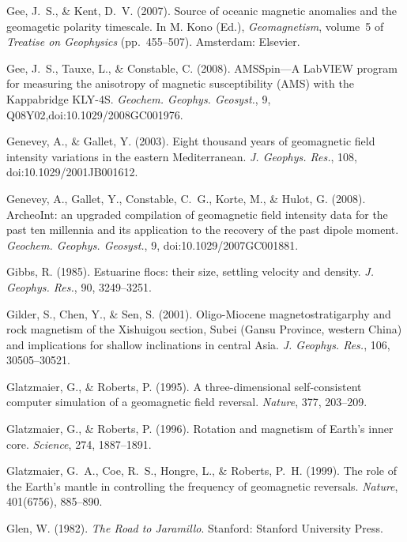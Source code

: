 \documentclass[,plain]{tauxe}
\begin{document}
\begin{thebibliography}{}
\bibitem{}%
Gee, J.~S., \& Kent, D.~V. (2007).
Source of oceanic magnetic anomalies and the geomagetic polarity timescale.
In M. Kono (Ed.), {\it Geomagnetism}, volume~5 of {\it Treatise on
Geophysics} (pp.\ 455--507). Amsterdam: Elsevier.

\bibitem{}%
Gee, J.~S., Tauxe, L., \& Constable, C. (2008).
AMSSpin---A LabVIEW program for measuring the anisotropy of magnetic susceptibility (AMS) with the Kappabridge KLY-4S.
{\it Geochem. Geophys. Geosyst.}, 9, Q08Y02,doi:10.1029/2008GC001976.

\bibitem{}%
Genevey, A., \& Gallet, Y. (2003).
Eight thousand years of geomagnetic field intensity variations in the eastern Mediterranean.
{\it J. Geophys. Res.}, 108, doi:10.1029/2001JB001612.

\bibitem{}%
Genevey, A., Gallet, Y., Constable, C.~G., Korte, M., \& Hulot, G. (2008).
ArcheoInt: an upgraded compilation of geomagnetic field intensity data for the past ten millennia and its application to the recovery of the past dipole moment.
{\it Geochem. Geophys. Geosyst.}, 9, doi:10.1029/2007GC001881.

\bibitem{}%
Gibbs, R. (1985).
Estuarine flocs: their size, settling velocity and density.
{\it J. Geophys. Res.}, 90, 3249--3251.

\bibitem{}%
Gilder, S., Chen, Y., \& Sen, S. (2001).
Oligo-Miocene magnetostratigarphy and rock magnetism of the Xishuigou section, Subei (Gansu Province, western China) and implications for shallow inclinations in central Asia.
{\it J. Geophys. Res.}, 106, 30505--30521.

\bibitem{}%
Glatzmaier, G., \& Roberts, P. (1995).
A three-dimensional self-consistent computer simulation of a geomagnetic field reversal.
{\it Nature}, 377, 203--209.

\bibitem{}%
Glatzmaier, G., \& Roberts, P. (1996).
Rotation and magnetism of Earth's inner core.
{\it Science}, 274, 1887--1891.

\bibitem{}%
Glatzmaier, G.~A., Coe, R.~S., Hongre, L., \& Roberts, P.~H. (1999).
The role of the Earth's mantle in controlling the frequency of geomagnetic reversals.
{\it Nature}, 401(6756), 885--890.

\bibitem{}%
Glen, W. (1982).
{\it The Road to Jaramillo}.
Stanford: Stanford University Press.


\end{thebibliography}
\end{document}

